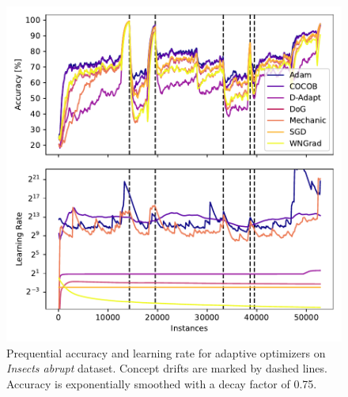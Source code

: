 \documentclass[runningheads]{llncs}
\begin{document}
\begin{figure}[ht]
	\centering
	\includegraphics[width=.47\textwidth]{figures/lr_norms_optims_insects_abrupt.pdf}
	\caption{Prequential accuracy and learning rate for adaptive optimizers on \textit{Insects abrupt} dataset. Concept drifts are marked by dashed lines. Accuracy is exponentially smoothed with a decay factor of 0.75.}
	\label{fig:prequential_optims_insects}
\end{figure}
\end{document}
